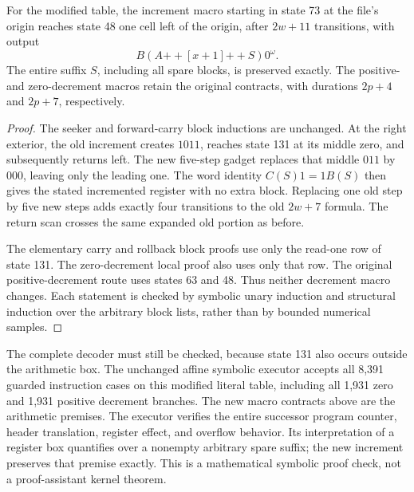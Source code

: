 \begin{lemma}
For the modified table, the increment macro starting in state 73 at the
file's origin reaches state 48 one cell left of the origin, after
$2w+11$ transitions, with output
\[
 B(A\mathbin{+\!+}[x+1]\mathbin{+\!+}S)0^\omega.
\]
The entire suffix $S$, including all spare blocks, is preserved exactly.
The positive- and zero-decrement macros retain the original contracts,
with durations $2p+4$ and $2p+7$, respectively.
\end{lemma}
\begin{proof}
The seeker and forward-carry block inductions are unchanged.  At the
right exterior, the old increment creates $1011$, reaches state 131 at
its middle zero, and subsequently returns left.  The new five-step
gadget replaces that middle $011$ by $000$, leaving only the leading
one.  The word identity $C(S)1=1B(S)$ then gives the stated incremented
register with no extra block.  Replacing one old step by five new steps
adds exactly four transitions to the old $2w+7$ formula.  The return
scan crosses the same expanded old portion as before.

The elementary carry and rollback block proofs use only the read-one
row of state 131.  The zero-decrement local proof also uses only that
row.  The original positive-decrement route uses states 63 and 48.
Thus neither decrement macro changes.  Each statement is checked by
symbolic unary induction and structural induction over the arbitrary
block lists, rather than by bounded numerical samples.
\end{proof}

The complete decoder must still be checked, because state 131 also
occurs outside the arithmetic box.  The unchanged affine symbolic
executor accepts all 8,391 guarded instruction cases on this modified
literal table, including all 1,931 zero and 1,931 positive decrement
branches.  The new macro contracts above are the arithmetic premises.
The executor verifies the entire successor program counter, header
translation, register effect, and overflow behavior.  Its interpretation
of a register box quantifies over a nonempty arbitrary spare suffix;
the new increment preserves that premise exactly.  This is a
mathematical symbolic proof check, not a proof-assistant kernel theorem.

